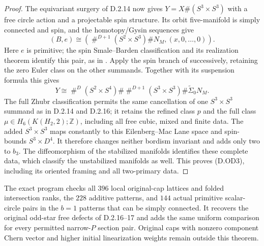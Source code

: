 \begin{proof}
The equivariant surgery of D.2.14 now gives
$Y=X\#(S^3\times S^3)$ with a free circle action and a
projectable spin structure. Its orbit five-manifold is
simply connected and spin, and the homotopy/Gysin sequences
give
\[
 (B,e)\cong
 \left(\mathop{\#}^{D+1}(S^2\times S^3)\#N_M,
                        (x,0,\ldots,0)\right).
\]
Here $e$ is primitive; the spin Smale--Barden classification
and its realization theorem identify this pair, as in
\cite[Theorems 2.2--2.3]{manBarden65}.
Apply the spin branch of \cite[Theorem A]{manGR25}
successively, retaining the zero Euler class on the other
summands. Together with its suspension formula this gives
\[
 Y\cong\mathop{\#}^{D}(S^2\times S^4)
       \#\mathop{\#}^{D+1}(S^3\times S^3)
       \#\widetilde\Sigma_0N_M.
\]
The full Zhubr classification permits the same cancellation
of one $S^3\times S^3$ summand as in D.2.14 and D.2.16;
it retains the refined class $p$ and the full class
$\mu\in H_6(K(H_2,2);\mathbb Z)$, including all free cubic,
mixed and finite data. The added $S^3\times S^3$ maps
constantly to this Eilenberg--Mac Lane space and spin-bounds
$S^3\times D^4$. It therefore changes neither bordism
invariant and adds only two to $b_3$. The diffeomorphism of
the stabilized manifolds identifies these complete data,
which classify the unstabilized manifolds as well.
This proves (D.OD3), including its oriented framing and
all two-primary data.
\end{proof}

The exact program 
checks all $396$ local original-cap lattices and folded
intersection ranks, the $228$ additive patterns, and $144$
actual primitive scalar-circle pairs in the $b=1$ patterns
that can be simply connected. It recovers the original
odd-star free defects of D.2.16--17 and adds the same uniform
comparison for every permitted narrow-$P$ section pair.
Original caps with nonzero component Chern vector and higher
initial linearization weights remain outside this theorem.
